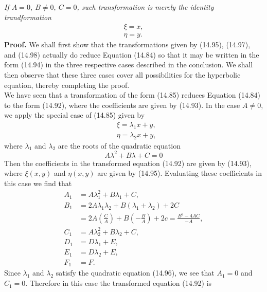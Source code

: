 \documentclass[11pt,a4paper, twoside]{report}
\begin{document}
	\textit{If $A = 0,\ B\neq 0,\ C = 0$, such transformation is merely the identity trandformation}
	\begin{equation}\tag{19.98}
		\begin{aligned}
			\xi = x,\\
			\eta = y.
		\end{aligned}
	\end{equation}
	\textbf{Proof.}  We shall first show that the transformations given by (14.95), (14.97), and (14.98) actually do reduce Equation (14.84) so that it may be written in the form (14.94) in the three respective cases described in the conclusion. We shall then observe that these three cases cover all possibilities for the hyperbolic equation, thereby completing the proof.\\
	We have seen that a transformation of the form (14.85) reduces Equation (14.84) to the form (14.92), where the coefficients are given by (14.93). In the case $A \neq 0$, we apply the special case of (14.85) given by
	\begin{equation}\tag{14.95}
		\begin{aligned}
			&\xi = \lambda_1x + y,\\
			&\eta = \lambda_2x + y,
		\end{aligned}
	\end{equation}
	where $\lambda_1$ and $\lambda_2$ are the roots of the quadratic equation
	\begin{equation}\tag{14.96}
		A\lambda^2 + B\lambda + C = 0
	\end{equation}
	Then the coefficients in the transformed equation (14.92) are given by (14.93), where $\xi(x, y)$ and $\eta(x, y)$ are given by (14.95). Evaluating these coefficients in this case we find that
	\begin{align*}
		 A_1 &= A\lambda_1^2 + B\lambda_1 + C,\\
		 B_1 &= 2A\lambda_1\lambda_2 + B(\lambda_1 + \lambda_2) + 2C\\
		 &= 2A\left(\frac{C}{A}\right) + B\left(-\frac{B}{A}\right) + 2c = \frac{B^2 - 4AC}{-A},\\
		 C_1 &= A\lambda_2^2 + B\lambda_2 + C,\\
		 D_1 &= D\lambda_1 + E,\\
		 E_1 &= D\lambda_2 + E,\\
		 F_1 &= F.
	\end{align*}
	Since $\lambda_1$ and $\lambda_2$ satisfy the quadratic equation (14.96), we see that $A_1 = 0$ and $C_1 = 0$. Therefore in this case the transformed equation (14.92) is
\end{document}
